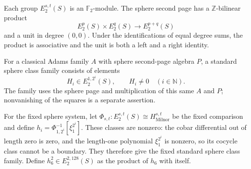 \begin{definition}
\label{frontier:AdamsSynthetic:f05463b82afe}
Each group $E_2^{s,t}(S)$ is an $\mathbb F_2$-module. The sphere second page has a $\mathbb Z$-bilinear product
\[
E_2^p(S)\times E_2^q(S)\longrightarrow E_2^{p+q}(S)
\]
and a unit in degree $(0,0)$. Under the identifications of equal degree sums, the product is associative and the unit is both a left and a right identity.
\end{definition}

\begin{definition}[The standard sphere classes]
\label{sem:AdamsSynthetic:standard-classes}
For a classical Adams family $A$ with sphere second-page algebra $P$, a
standard sphere class family consists of elements
\[
H_i\in E_2^{1,2^i}(S),\qquad H_i\ne0\quad(i\in\mathbb N).
\]
The family uses the sphere page and multiplication of this same $A$ and
$P$; nonvanishing of the squares is a separate assertion.

For the fixed sphere system, let
$\Phi_{s,t}\colon E_2^{s,t}(S)\cong H^{s,t}_{\mathrm{Milnor}}$ be the
fixed comparison and define
$h_i=\Phi_{1,2^i}^{-1}[\xi_1^{2^i}]$. These classes are nonzero: the
cobar differential out of length zero is zero, and the length-one
polynomial $\xi_1^{2^i}$ is nonzero, so its cocycle class cannot be a
boundary. They therefore give the fixed standard sphere class family.
Define $h_6^2\in E_2^{2,128}(S)$ as the product of $h_6$ with itself.
\end{definition}

